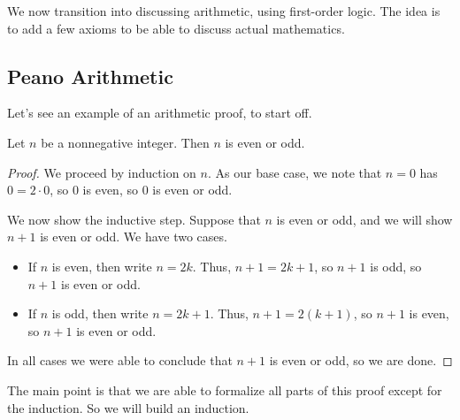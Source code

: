 
We now transition into discussing arithmetic, using first-order logic. The idea is to add a few axioms to be able to discuss actual mathematics.

\subsection{Peano Arithmetic}
Let's see an example of an arithmetic proof, to start off.
\begin{lemma}
	Let $n$ be a nonnegative integer. Then $n$ is even or odd.
\end{lemma}
\begin{proof}
	We proceed by induction on $n$. As our base case, we note that $n=0$ has $0=2\cdot0$, so $0$ is even, so $0$ is even or odd.

	We now show the inductive step. Suppose that $n$ is even or odd, and we will show $n+1$ is even or odd. We have two cases.
	\begin{itemize}
		\item If $n$ is even, then write $n=2k$. Thus, $n+1=2k+1$, so $n+1$ is odd, so $n+1$ is even or odd.
		\item If $n$ is odd, then write $n=2k+1$. Thus, $n+1=2(k+1)$, so $n+1$ is even, so $n+1$ is even or odd.
	\end{itemize}
	In all cases we were able to conclude that $n+1$ is even or odd, so we are done.
\end{proof}
The main point is that we are able to formalize all parts of this proof except for the induction. So we will build an induction.

